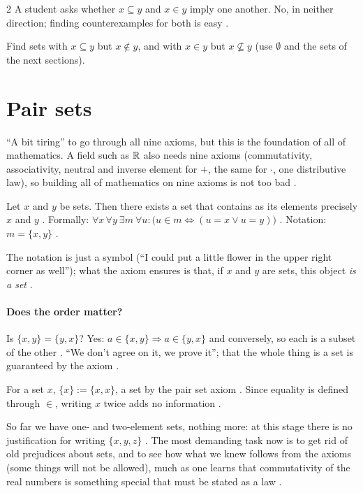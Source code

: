 \begin{paracol}{2}
A student asks whether $x\subseteq y$ and $x\in y$ imply one another. No, in neither direction; finding
counterexamples for both is easy .
\begin{exercise}\label{ex:se-subset-in}
Find sets with $x\subseteq y$ but $x\notin y$, and with $x\in y$ but $x\not\subseteq y$ (use $\emptyset$ and the sets of
the next sections).
\end{exercise}

\section{Pair sets}\label{sec:se-pair}

``A bit tiring'' to go through all nine axioms, but this is the foundation of all of mathematics. A field such as
$\mathbb{R}$ also needs nine axioms (commutativity, associativity, neutral and inverse element for $+$, the same for
$\cdot$, one distributive law), so building all of mathematics on nine axioms is not too bad
.

\begin{definition}\label{ax:se-pair}
Let $x$ and $y$ be sets. Then there exists a set that contains as its elements precisely $x$ and $y$
. Formally: $\forall x\,\forall y\ \exists m\ \forall u\colon\bigl(u\in m\Leftrightarrow
(u=x\vee u=y)\bigr)$ . Notation: $m=\{x,y\}$ .
\end{definition}
The notation is just a symbol (``I could put a little flower in the upper right corner as well''); what the axiom
ensures is that, if $x$ and $y$ are sets, this object \emph{is a set} .

\paragraph{Does the order matter?} Is $\{x,y\}=\{y,x\}$? Yes: $a\in\{x,y\}\Rightarrow a\in\{y,x\}$ and conversely, so
each is a subset of the other . ``We don't agree on it, we prove it'';
that the whole thing is a set is guaranteed by the axiom .

\begin{definition}\label{def:se-singleton}
For a set $x$, $\{x\}:=\{x,x\}$, a set by the pair set axiom . Since equality is defined
through $\in$, writing $x$ twice adds no information .
\end{definition}
So far we have one- and two-element sets, nothing more: at this stage there is no justification for writing
$\{x,y,z\}$ . The most demanding task now is to get rid of old prejudices about sets, and to see how
what we knew follows from the axioms (some things will not be allowed), much as one learns that commutativity of
the real numbers is something special that must be stated as a law .


\end{paracol}
